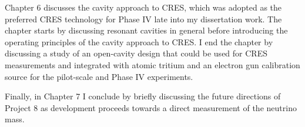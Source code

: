 Chapter 6 discusses the cavity approach to CRES, which was adopted as the preferred CRES technology for Phase IV late into my dissertation work. The chapter starts by discussing resonant cavities in general before introducing the operating principles of the cavity approach to CRES. I end the chapter by discussing a study of an open-cavity design that could be used for CRES measurements and integrated with atomic tritium and an electron gun calibration source for the pilot-scale and Phase IV experiments.

Finally, in Chapter 7 I conclude by briefly discussing the future directions of Project 8 as development proceeds towards a direct measurement of the neutrino mass. 




